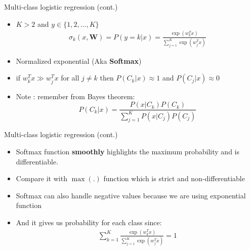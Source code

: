 \documentclass[serif, aspectratio=169]{beamer}
\begin{document}
\begin{frame}{Multi-class logistic regression (cont.)}
    \begin{itemize}
        \item $K > 2$ and $y \in \{1,2,\dots,K\}$
        \begin{align*}
            \sigma _k(x, \mathbf{W}) = P(y=k|x) = \frac{\exp{(w^T_kx)}}{\sum_{j=1}^{K}\exp{(w_j^Tx)}}
        \end{align*}
        \item Normalized exponential (Aka \textbf{Softmax})
          
            \item if $w_k^Tx \gg w_j^Tx$ for all $j \neq k$ then $P(C_k|x) \approx 1$ and $P(C_j|x) \approx 0$
            \item Note : remember from Bayes theorem:
                \[
                P(C_k|x) = \frac{P(x|C_k)P(C_k)}
            {\sum_{j=1}^{K}P(x|C_j)P(C_j)}
                \]
          
    \end{itemize}
\end{frame}
\begin{frame}{Multi-class logistic regression (cont.)}
    \begin{itemize}
        \item Softmax function \textbf{smoothly} highlights the maximum probability and is differentiable.
        \item Compare it with $\max (.)$ function which is strict and non-differentiable
        \item Softmax can also handle negative values because we are using exponential function
        \item And it gives us probability for each class since:
            \begin{align*}
                \displaystyle \sum _{k=1}^{K} \frac{\exp (w_k^Tx)}{\sum _{j=1}^{K} \exp (w_j^Tx) } = 1
            \end{align*}
    \end{itemize}
\end{frame}
\end{document}
